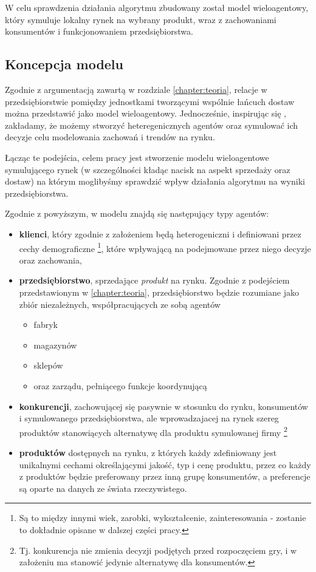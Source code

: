\documentclass[polish, twoside, 12pt, a4paper]{article}
\theoremstyle{definition}
\theoremstyle{plain}
\theoremstyle{remark}
\begin{document}
W celu sprawdzenia działania algorytmu zbudowany został model wieloagentowy, który symuluje lokalny rynek na wybrany produkt, wraz z zachowaniami konsumentów i funkcjonowaniem przedsiębiorstwa.

\subsection{Koncepcja modelu} \label{chapter:koncepcja}

Zgodnie z argumentacją zawartą w rozdziale \ref{chapter:teoria}, relacje w przedsiębiorstwie pomiędzy jednostkami tworzącymi wspólnie łańcuch dostaw można przedstawić jako model wieloagentowy. Jednocześnie, inspirując się \cite{Kaminski2012}, zakładamy, że możemy stworzyć heteregenicznych agentów oraz symulować ich decyzje celu modelowania zachowań i trendów na rynku. 

Łącząc te podejścia, celem pracy jest stworzenie modelu wieloagentowe symulującego rynek (w szczególności kładąc nacisk na aspekt sprzedaży oraz dostaw) na którym moglibyśmy sprawdzić wpływ działania algorytmu na wyniki przedsiębiorstwa.

Zgodnie z powyższym, w modelu znajdą się następujący typy agentów: 

\begin{itemize} 
	\item \textbf{klienci}, który zgodnie z założeniem będą heterogeniczni i definiowani przez cechy demograficzne \footnote{Są to między innymi wiek, zarobki, wykształcenie, zainteresowania - zostanie to dokładnie opisane w dalszej części pracy.}, które wpływającą na podejmowane przez niego decyzje oraz zachowania, 
	\item \textbf{przedsiębiorstwo}, sprzedające \textit{produkt} na rynku. Zgodnie z podejściem przedstawionym w \ref{chapter:teoria}, przedsiębiorstwo będzie rozumiane jako zbiór niezależnych, współpracujących ze sobą agentów 
		\begin{itemize}
			\item fabryk
			\item magazynów
			\item sklepów 
			\item oraz zarządu, pełniącego funkcje koordynującą 
		\end{itemize}
	\item \textbf{konkurencji}, zachowującej się pasywnie w stosunku do rynku, konsumentów i symulowanego przedsiębiorstwa, ale wprowadzajacej na rynek szereg produktów stanowiących alternatywę dla produktu symulowanej firmy \footnote{Tj. konkurencja nie zmienia decyzji podjętych przed rozpoczęciem gry, i w założeniu ma stanowić jedynie alternatywę dla konsumentów.} 
	\item \textbf{produktów} dostępnych na rynku, z których każdy zdefiniowany jest unikalnymi cechami określającymi jakość, typ i cenę produktu, przez co każdy z produktów będzie preferowany przez inną grupę konsumentów, a preferencje są oparte na danych ze świata rzeczywistego. 
\end{itemize}
\end{document}

